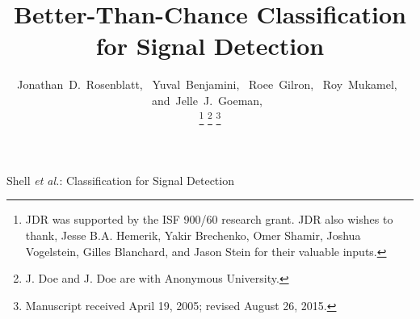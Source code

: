 \documentclass[journal]{IEEEtran}
\begin{document}
\title{Better-Than-Chance Classification for Signal Detection}
%
%
%

\author{Jonathan~D.~Rosenblatt,~
        Yuval~Benjamini,~
        Roee~Gilron,~
        Roy~Mukamel,~
        and~Jelle~J.~Goeman,~%

\thanks{JDR was supported by the ISF 900/60 research grant. 
	JDR also wishes to thank, Jesse B.A. Hemerik, Yakir Brechenko, Omer Shamir, Joshua Vogelstein, Gilles Blanchard, and Jason Stein for their valuable inputs. 
	}%
\thanks{J. Doe and J. Doe are with Anonymous University.}%
\thanks{Manuscript received April 19, 2005; revised August 26, 2015.}}

% 
%



%
{Shell \MakeLowercase{\textit{et al.}}: Classification for Signal Detection}
\end{document}
